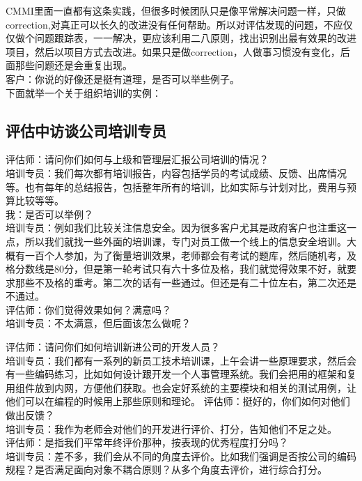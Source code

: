 CMMI里面一直都有这条实践，但很多时候团队只是像平常解决问题一样，只做correction,对真正可以长久的改进没有任何帮助。所以对评估发现的问题，不应仅仅做个问题跟踪表，一一解决，更应该利用二八原则，找出识别出最有效果的改进项目，然后以项目方式去改进。如果只是做correction，人做事习惯没有变化，后面那些问题还是会重复出现。\\
客户：你说的好像还是挺有道理，是否可以举些例子。\\
下面就举一个关于组织培训的实例：\\
\hypertarget{ux603bux7ed3ux8bbfux8c08ux7684ux95eeux9898ux53d1ux73b0}{%
\subsection{评估中访谈公司培训专员}\label{ux603bux7ed3ux8bbfux8c08ux7684ux95eeux9898ux53d1ux73b0}}
评估师：请问你们如何与上级和管理层汇报公司培训的情况？\\
培训专员：我们每次都有培训报告，内容包括学员的考试成绩、反馈、出席情况等。也有每年的总结报告，包括整年所有的培训，比如实际与计划对比，费用与预算比较等等。\\
我：是否可以举例？\\
培训专员：例如我们比较关注信息安全。因为很多客户尤其是政府客户也注重这一点，所以我们就找一些外面的培训课，专门对员工做一个线上的信息安全培训。大概有一百个人参加，为了衡量培训效果，老师都会有考试的题库，然后随机考，及格分数线是80分，但是第一轮考试只有六十多位及格，我们就觉得效果不好，就要求那些不及格的重考。第二次的话有一些通过。但还是有二十位左右，第二次还是不通过。\\
评估师：你们觉得效果如何？满意吗？\\
培训专员：不太满意，但后面该怎么做呢？

\begin{description}
\item[]
\end{description}

评估师：请问你们如何培训新进公司的开发人员？\\
培训专员：我们都有一系列的新员工技术培训课，上午会讲一些原理要求，然后会有一些编码练习，比如如何设计跟开发一个人事管理系统。我们会把用的框架和复用组件放到内网，方便他们获取。也会定好系统的主要模块和相关的测试用例，让他们可以在编程的时候用上那些原则和理论。
评估师：挺好的，你们如何对他们做出反馈？\\
培训专员：我作为老师会对他们的开发进行评价、打分，告知他们不足之处。\\
评估师：是指我们平常年终评价那种，按表现的优秀程度打分吗？\\
培训专员：差不多，我们会从不同的角度去评价。比如我们强调是否按公司的编码规程？是否满足面向对象不耦合原则？从多个角度去评价，进行综合打分。\\

